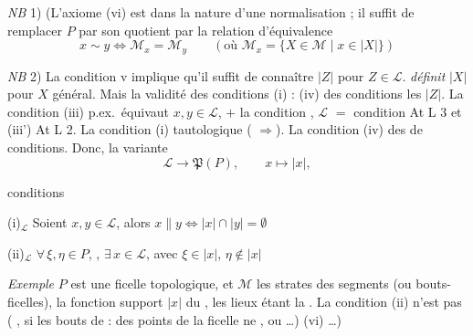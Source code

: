 \documentclass[11pt,a4paper]{article}
\begin{document}
\emph{NB} 1) \struck{\ill{}} (L'axiome (vi) est dans la nature d'une normalisation ; il suffit de remplacer $P$ par son quotient par la relation d'équivalence
\[
  x \sim y \iff \mathcal{M}_x = \mathcal{M}_y \qquad (\text{où } \mathcal{M}_x = \lbrace X \in \mathcal{M} \mid x \in |X| \rbrace)
\]

\emph{NB} 2) La condition v implique qu'il suffit de connaître $|Z|$ pour $Z \in \mathcal{L}$.  \struck{\ill{}}  \emph{définit}  $|X|$ pour $X$ général. Mais la validité des conditions (i) : (iv)  des conditions  les $|Z|$. La condition (iii) p.ex.\ équivaut    $x, y \in \mathcal{L}$, $+$ la condition \struck{\ill{}} , $\mathcal{L}$ $=$ condition  \struck{\ill{} \ill{}} At L 3 et (iii') At L 2.  La condition (i) tautologique ( $\Rightarrow$). La condition (iv)  des    \ill{} \ill{} de   conditions. Donc, la variante
\[
  \mathcal{L} \longrightarrow \mathfrak{P}(P) , \qquad x \longmapsto |x| ,
\]

conditions

(i)$_{\mathcal{L}}$ \quad Soient $x, y \in \mathcal{L}$, alors  $x \parallel y \iff |x| \cap |y| = \emptyset$

(ii)$_{\mathcal{L}}$ \quad \struck{\ill{}} $\forall\, \xi, \eta \in P$, \add{$\xi \neq \eta$}, $\exists\, x \in \mathcal{L}$, avec $\xi \in |x|$, $\eta \notin |x|$ 

\emph{Exemple} \quad $P$ est une ficelle topologique, et $\mathcal{M}$ les strates des  segments (ou bouts-ficelles), la fonction support $|x|$ \struck{\ill{}} du ,    les lieux étant la  . La condition (ii) n'est pas  (\ill{} \ill{} \ill{}, si les bouts de \ill{} \ill{} \ill{} : des points de la ficelle ne  \ill{} \ill{} \ill{}, ou \ill{} \ill{} \ill{} \ill{} \ill{}…)  (vi)  …)
\end{document}
